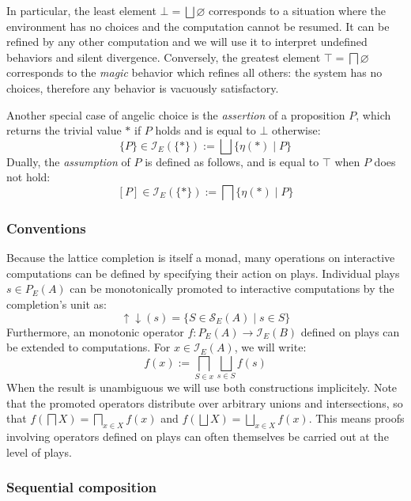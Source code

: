\documentclass[format=sigplan,authordraft]{acmart}
\begin{document}
In particular,
the least element $\bot = \bigsqcup \varnothing$
corresponds to a situation where the environment has no choices
and the computation cannot be resumed.
It can be refined by any other computation and
we will use it to interpret undefined behaviors and silent divergence.
Conversely,
the greatest element $\top = \bigsqcap \varnothing$
corresponds to the \emph{magic} behavior
which refines all others:
the system has no choices,
therefore any behavior is vacuously satisfactory.

Another special case of angelic choice is
the \emph{assertion} of a proposition $P$,
which returns the trivial value $*$ if $P$ holds
and is equal to $\bot$ otherwise:
\[ \{P\} \in \mathcal{I}_E(\{*\}) :=
    \bigsqcup \{ \eta(*) \mid P \} \]
Dually,
the \emph{assumption} of $P$
is defined as follows,
and is equal to $\top$ when $P$ does not hold:
\[ [P] \in \mathcal{I}_E(\{*\}) :=
    \bigsqcap \{ \eta(*) \mid P \} \]

\subsubsection{Conventions}

Because the lattice completion is itself a monad,
many operations on interactive computations
can be defined by specifying their action on plays.
Individual plays $s \in P_E(A)$ can be monotonically promoted to
interactive computations by the completion's unit as:
\[
    {\uparrow \downarrow}(s) =
      \{ S \in \mathcal{S}_E(A) \mid s \in S \}
\]
Furthermore,
an monotonic operator $f : P_E(A) \rightarrow \mathcal{I}_E(B)$
defined on plays can be extended to computations.
For $x \in \mathcal{I}_E(A)$, we will write:
\[
  f(x) := \bigsqcap_{S \in x} \bigsqcup_{s \in S} f(s)
\]
When the result is unambiguous we will use both constructions
implicitely.
Note that the promoted operators
distribute over arbitrary unions and intersections, so that
$f(\bigsqcap X) = \bigsqcap_{x \in X} f(x)$ and
$f(\bigsqcup X) = \bigsqcup_{x \in X} f(x)$.
This means proofs involving operators defined on plays
can often themselves be carried out at the level of plays.

\subsubsection{Sequential composition}
\end{document}
